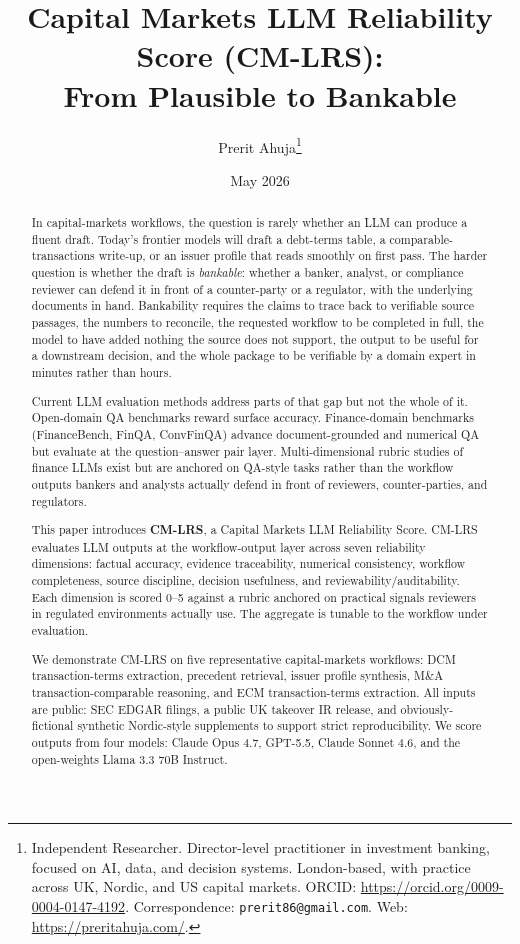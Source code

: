 \documentclass[11pt]{article}
\title{\textbf{Capital Markets LLM Reliability Score (CM-LRS):\\From Plausible to Bankable}}
\author{
  Prerit Ahuja\thanks{Independent Researcher. Director-level practitioner in investment banking, focused on AI, data, and decision systems. London-based, with practice across UK, Nordic, and US capital markets. ORCID: \url{https://orcid.org/0009-0004-0147-4192}. Correspondence: \texttt{prerit86@gmail.com}. Web: \url{https://preritahuja.com/}.}
}
\date{May 2026}
\begin{document}
\maketitle

\begin{abstract}
\noindent
In capital-markets workflows, the question is rarely whether an LLM can produce a fluent draft. Today's frontier models will draft a debt-terms table, a comparable-transactions write-up, or an issuer profile that reads smoothly on first pass. The harder question is whether the draft is \emph{bankable}: whether a banker, analyst, or compliance reviewer can defend it in front of a counter-party or a regulator, with the underlying documents in hand. Bankability requires the claims to trace back to verifiable source passages, the numbers to reconcile, the requested workflow to be completed in full, the model to have added nothing the source does not support, the output to be useful for a downstream decision, and the whole package to be verifiable by a domain expert in minutes rather than hours.

Current LLM evaluation methods address parts of that gap but not the whole of it. Open-domain QA benchmarks reward surface accuracy. Finance-domain benchmarks (FinanceBench, FinQA, ConvFinQA) advance document-grounded and numerical QA but evaluate at the question--answer pair layer. Multi-dimensional rubric studies of finance LLMs exist but are anchored on QA-style tasks rather than the workflow outputs bankers and analysts actually defend in front of reviewers, counter-parties, and regulators.

This paper introduces \textbf{CM-LRS}, a Capital Markets LLM Reliability Score. CM-LRS evaluates LLM outputs at the workflow-output layer across seven reliability dimensions: factual accuracy, evidence traceability, numerical consistency, workflow completeness, source discipline, decision usefulness, and reviewability/auditability. Each dimension is scored 0--5 against a rubric anchored on practical signals reviewers in regulated environments actually use. The aggregate is tunable to the workflow under evaluation.

We demonstrate CM-LRS on five representative capital-markets workflows: DCM transaction-terms extraction, precedent retrieval, issuer profile synthesis, M\&A transaction-comparable reasoning, and ECM transaction-terms extraction. All inputs are public: SEC EDGAR filings, a public UK takeover IR release, and obviously-fictional synthetic Nordic-style supplements to support strict reproducibility. We score outputs from four models: Claude Opus 4.7, GPT-5.5, Claude Sonnet 4.6, and the open-weights Llama 3.3 70B Instruct.


\end{abstract}
\end{document}
